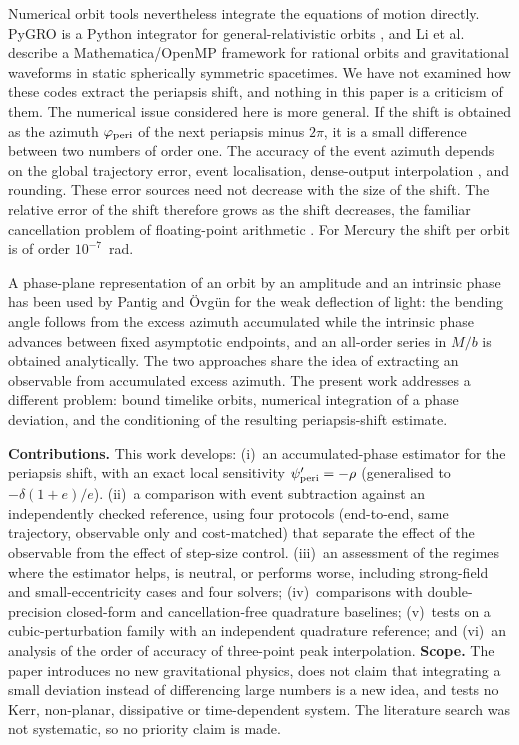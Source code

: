 \documentclass[11pt,a4paper]{article}
\begin{document}
Numerical orbit tools nevertheless integrate the equations of motion directly. PyGRO is a Python integrator for general-relativistic orbits \citep{DellaMonica2025}, and Li et al.\ \citep{Li2026} describe a Mathematica/OpenMP framework for rational orbits and gravitational waveforms in static spherically symmetric spacetimes. We have not examined how these codes extract the periapsis shift, and nothing in this paper is a criticism of them. The numerical issue considered here is more general. If the shift is obtained as the azimuth $\varphi_{\rm peri}$ of the next periapsis minus $2\pi$, it is a small difference between two numbers of order one. The accuracy of the event azimuth depends on the global trajectory error, event localisation, dense-output interpolation \citep{Shampine1991,Shampine2000}, and rounding. These error sources need not decrease with the size of the shift. The relative error of the shift therefore grows as the shift decreases, the familiar cancellation problem of floating-point arithmetic \citep{Higham2002}. For Mercury the shift per orbit is of order $10^{-7}$~rad.

A phase-plane representation of an orbit by an amplitude and an intrinsic phase has been used by Pantig and \"Ovg\"un \citep{PantigOvgun2026} for the weak deflection of light: the bending angle follows from the excess azimuth accumulated while the intrinsic phase advances between fixed asymptotic endpoints, and an all-order series in $M/b$ is obtained analytically. The two approaches share the idea of extracting an observable from accumulated excess azimuth. The present work addresses a different problem: bound timelike orbits, numerical integration of a phase deviation, and the conditioning of the resulting periapsis-shift estimate.

\textbf{Contributions.} This work develops: (i)~an accumulated-phase estimator for the periapsis shift, with an exact local sensitivity $\psi'_{\rm peri}=-\rho$ (generalised to $-\delta(1+e)/e$). (ii)~a comparison with event subtraction against an independently checked reference, using four protocols (end-to-end, same trajectory, observable only and cost-matched) that separate the effect of the observable from the effect of step-size control. (iii)~an assessment of the regimes where the estimator helps, is neutral, or performs worse, including strong-field and small-eccentricity cases and four solvers; (iv)~comparisons with double-precision closed-form and cancellation-free quadrature baselines; (v)~tests on a cubic-perturbation family with an independent quadrature reference; and (vi)~an analysis of the order of accuracy of three-point peak interpolation. \textbf{Scope.} The paper introduces no new gravitational physics, does not claim that integrating a small deviation instead of differencing large numbers is a new idea, and tests no Kerr, non-planar, dissipative or time-dependent system. The literature search was not systematic, so no priority claim is made.
\end{document}
